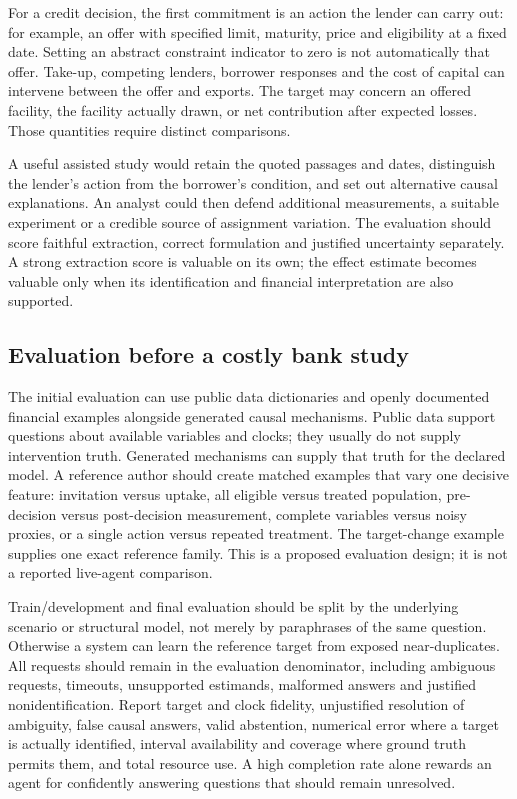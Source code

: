 For a credit decision, the first commitment is an action the lender can carry
out: for example, an offer with specified limit, maturity, price and eligibility
at a fixed date. Setting an abstract constraint indicator to zero is not
automatically that offer. Take-up, competing lenders, borrower responses and
the cost of capital can intervene between the offer and exports. The target
may concern an offered facility, the facility actually drawn, or net
contribution after expected losses. Those quantities require distinct
comparisons.

A useful assisted study would retain the quoted passages and dates, distinguish
the lender's action from the borrower's condition, and set out alternative
causal explanations. An analyst could then defend additional measurements,
a suitable experiment or a credible source of assignment variation. The
evaluation should score faithful extraction, correct formulation and justified
uncertainty separately. A strong extraction score is valuable on its own;
the effect estimate becomes valuable only when its identification and financial
interpretation are also supported.

\hypertarget{evaluation-before-a-costly-bank-study}{%
\subsection{Evaluation before a costly bank
study}\label{evaluation-before-a-costly-bank-study}}

The initial evaluation can use public data dictionaries and openly
documented financial examples alongside generated causal mechanisms.
Public data support questions about available variables and clocks; they
usually do not supply intervention truth. Generated mechanisms can
supply that truth for the declared model. A reference author should
create matched examples that vary one decisive feature: invitation
versus uptake, all eligible versus treated population, pre-decision
versus post-decision measurement, complete variables versus noisy
proxies, or a single action versus repeated treatment. The target-change
example supplies one exact reference family. This is a proposed
evaluation design; it is not a reported live-agent comparison.

Train/development and final evaluation should be split by the underlying
scenario or structural model, not merely by paraphrases of the same
question. Otherwise a system can learn the reference target from exposed
near-duplicates. All requests should remain in the evaluation
denominator, including ambiguous requests, timeouts, unsupported
estimands, malformed answers and justified nonidentification. Report
target and clock fidelity, unjustified resolution of ambiguity, false
causal answers, valid abstention, numerical error where a target is
actually identified, interval availability and coverage where ground
truth permits them, and total resource use. A high completion rate alone
rewards an agent for confidently answering questions that should remain
unresolved.

